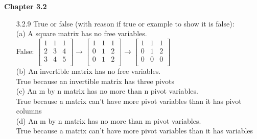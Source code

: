 \documentclass[10pt,twoside,reqno]{article}
\begin{document}
\begin{enumerate}
\end{enumerate}
\vspace{5mm}
\textbf{Chapter 3.2}
\begin{enumerate}
\item[3.2.9] True or false (with reason if true or example to show it is false): \\ \vspace{1mm}
{\addtolength{\leftskip}{5mm}
(a) A square matrix has no free variables. \\ \vspace{1mm}
\vspace{3mm}
False:
$
$$
\begin{bmatrix}
1&1&1\\
2&3&4\\
3&4&5\\
\end{bmatrix}
\rightarrow
\begin{bmatrix}
1&1&1\\
0&1&2\\
0&1&2\\
\end{bmatrix}
\rightarrow
\begin{bmatrix}
1&1&1\\
0&1&2\\
0&0&0\\
\end{bmatrix}
$$
$\\
\vspace{3mm}
(b) An invertible matrix has no free variables. \\ \vspace{1mm}
\vspace{3mm}
True because an invertible matrix has three pivots\\
\vspace{3mm}
(c) An m by n matrix has no more than n pivot variables. \\ \vspace{1mm}
\vspace{3mm}
True because a matrix can't have more pivot variables than it has pivot columns\\
\vspace{3mm}
(d) An m by n matrix has no more than m pivot variables. \\
\vspace{3mm}
True because a matrix can't have more pivot variables than it has variables\\
\vspace{3mm}
}


\end{enumerate}
\end{document}
